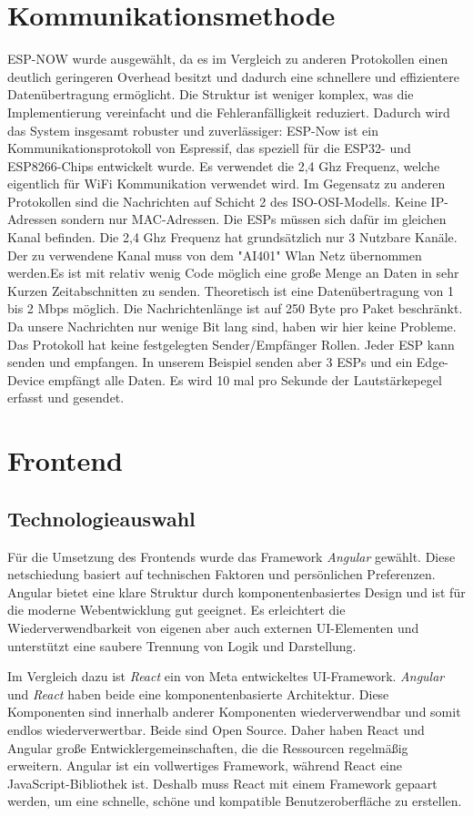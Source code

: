 \section{Kommunikationsmethode}
ESP-NOW wurde ausgewählt, da es im Vergleich zu anderen Protokollen einen deutlich geringeren Overhead besitzt und dadurch eine schnellere und effizientere Datenübertragung ermöglicht. Die Struktur ist weniger komplex, was die Implementierung vereinfacht und die Fehleranfälligkeit reduziert. 
Dadurch wird das System insgesamt robuster und zuverlässiger:
ESP-Now ist ein Kommunikationsprotokoll von Espressif, das speziell für die ESP32- und ESP8266-Chips entwickelt wurde. Es verwendet die 2,4 Ghz Frequenz, welche eigentlich für WiFi Kommunikation verwendet wird. 
Im Gegensatz zu anderen Protokollen sind die Nachrichten auf Schicht 2 des ISO-OSI-Modells. Keine IP-Adressen sondern nur MAC-Adressen. Die ESPs müssen sich dafür im gleichen Kanal befinden. Die 2,4 Ghz Frequenz hat grundsätzlich nur 3 Nutzbare Kanäle. 
Der zu verwendene Kanal muss von dem "AI401" Wlan Netz übernommen werden.Es ist mit relativ wenig Code möglich eine große Menge an Daten in sehr Kurzen Zeitabschnitten zu senden. Theoretisch ist eine Datenübertragung von 1 bis 2 Mbps möglich. 
Die Nachrichtenlänge ist auf 250 Byte pro Paket beschränkt. Da unsere Nachrichten nur wenige Bit lang sind, haben wir hier keine Probleme. 
Das Protokoll hat keine festgelegten Sender/Empfänger Rollen. Jeder ESP kann senden und empfangen. In unserem Beispiel senden aber 3 ESPs und ein Edge-Device empfängt alle Daten. 
Es wird 10 mal pro Sekunde der Lautstärkepegel erfasst und gesendet.


\section{Frontend}
\subsection{Technologieauswahl}
Für die Umsetzung des Frontends wurde das Framework \textit{Angular} gewählt. 
Diese netschiedung basiert auf technischen Faktoren und persönlichen Preferenzen. 
Angular bietet eine klare Struktur durch komponentenbasiertes Design und ist für die moderne Webentwicklung gut geeignet.
Es erleichtert die Wiederverwendbarkeit von eigenen aber auch externen UI-Elementen und unterstützt eine saubere Trennung von Logik und Darstellung. 

Im Vergleich dazu ist \textit{React} ein von Meta entwickeltes UI-Framework. 
\textit{Angular} und \textit{React} haben beide eine komponentenbasierte Architektur. 
Diese Komponenten sind innerhalb anderer Komponenten wiederverwendbar und somit endlos wiederverwertbar. 
Beide sind Open Source. Daher haben React und Angular große Entwicklergemeinschaften, die die Ressourcen regelmäßig erweitern.
Angular ist ein vollwertiges Framework, während React eine JavaScript-Bibliothek ist. 
Deshalb muss React mit einem Framework gepaart werden, um eine schnelle, schöne und kompatible Benutzeroberfläche zu erstellen. 
\cite{kinsta2023angularvreact}

